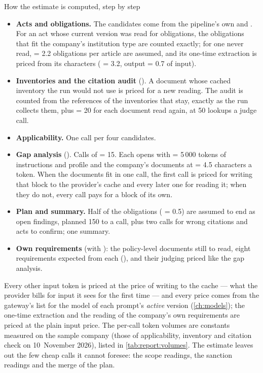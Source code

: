 \begin{codebox}{How the estimate is computed, step by step}
\begin{itemize}
  \item \textbf{Acts and obligations.} The candidates come from the pipeline's own
     and . For an act whose current version was
    read for obligations, the obligations that fit the company's institution type are counted
    exactly; for one never read,  = 2.2 obligations per article
    are assumed, and its one-time extraction is priced from its characters
    ( = 3.2, output  = 0.7 of input).
  \item \textbf{Inventories and the citation audit} (). A document whose
    cached inventory the run would not use is priced for a new reading. The audit is counted
    from the references of the inventories that stay, exactly as the run collects them, plus
     = 20 for each document read again, at 50 lookups a judge call.
  \item \textbf{Applicability.} One call per four candidates.
  \item \textbf{Gap analysis} (). Calls of  = 15.
    Each opens with  = 5\,000 tokens of instructions and profile and the
    company's documents at  = 4.5 characters a token. When the
    documents fit in one call, the first call is priced for writing that block to the
    provider's cache and every later one for reading it; when they do not, every call pays for
    a block of its own.
  \item \textbf{Plan and summary.} Half of the obligations ( = 0.5) are
    assumed to end as open findings, planned 150 to a call, plus two calls for wrong citations
    and acts to confirm; one summary.
  \item \textbf{Own requirements} (with ): the policy-level documents still
    to read, eight requirements expected from each (), and their
    judging priced like the gap analysis.
\end{itemize}
Every other input token is priced at the price of writing to the cache --- what the provider
bills for input it sees for the first time --- and every price comes from the gateway's list
for the model of each prompt's \emph{active} version (\cref{ch:models}); the one-time
extraction and the reading of the company's own requirements are priced at the plain input
price. The per-call token volumes are constants measured on the sample company (those of
applicability, inventory and citation check on 10~November 2026), listed in
\cref{tab:report:volumes}. The estimate leaves out the few cheap calls it cannot foresee: the
scope readings, the sanction readings and the merge of the plan.
\end{codebox}

